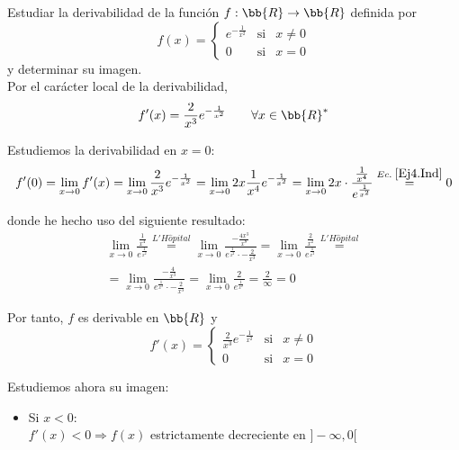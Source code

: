 \begin{ejercicio}
    Estudiar la derivabilidad de la función $f:\bb{R} \to \bb{R}$ definida por
    $$f(x)=\left\{
    \begin{array}{ccc}
    e^{-\frac{1}{x^2}} & \text{si} & x\neq0 \\
    0 & \text{si} & x=0
    \end{array}\right.$$
    y determinar su imagen.\\
    
    Por el carácter local de la derivabilidad,
    \begin{equation*}
        f'(x) = \frac{2}{x^3}e^{-\frac{1}{x^2}}  \qquad \forall x \in \bb{R}^\ast
    \end{equation*}
    
    Estudiemos la derivabilidad en $x=0$:
    \begin{equation*}
        f'(0) = \lim_{x\to 0} f'(x) = \lim_{x\to 0} \frac{2}{x^3}e^{-\frac{1}{x^2}}
        = \lim_{x\to 0} 2x\frac{1}{x^4}e^{-\frac{1}{x^2}}
        = \lim_{x\to 0} 2x \cdot \frac{\frac{1}{x^4}}{e^{\frac{1}{x^2}}}
        \stackrel{Ec.\;\ref{Ej4.Ind}}{=} 0
    \end{equation*}
    
    donde he hecho uso del siguiente resultado:
    \begin{multline}\label{Ej4.Ind}
        \lim_{x\to 0} \frac{\frac{1}{x^4}}{e^{\frac{1}{x^2}}} \stackrel{L'H\hat{o}pital}{=}
        \lim_{x\to 0} \frac{-\frac{4x^3}{x^8}}{e^{\frac{1}{x^2}} \cdot - \frac{2}{x^3}} = \lim_{x\to 0} \frac{\frac{2}{x^2}}{e^{\frac{1}{x^2}}} \stackrel{L'H\hat{o}pital}{=}\\=
        \lim_{x\to 0} \frac{-\frac{4}{x^3}}{e^{\frac{1}{x^2}} \cdot -\frac{2}{x^3}} = \lim_{x\to 0} \frac{2}{e^{\frac{1}{x^2}}} = \frac{2}{\infty} = 0
    \end{multline}

    Por tanto, $f$ es derivable en $\bb{R}$ y
    $$f'(x)=\left\{
    \begin{array}{ccc}
    \frac{2}{x^3}e^{-\frac{1}{x^2}} & \text{si} & x\neq0 \\
    0 & \text{si} & x=0
    \end{array}\right.$$

    Estudiemos ahora su imagen:
    \begin{itemize}
        \item Si $x<0$:\\
            $f'(x)<0 \Longrightarrow f(x)$ estrictamente decreciente en $]-\infty, 0[$


\end{itemize}
\end{ejercicio}

